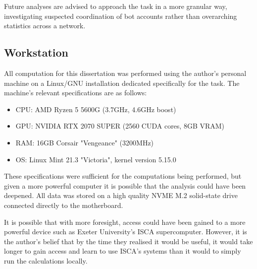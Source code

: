 \documentclass[a4paper,11pt]{article}  %
\begin{document}
	Future analyses are advised to approach the task in a more granular way, investigating suspected coordination of bot accounts rather than overarching statistics across a network.
	\newpage
	\begin{appendices}
	\section{Workstation}
	\label{app:work}
	All computation for this dissertation was performed using the author's personal machine on a Linux/GNU installation dedicated specifically for the task. The machine's relevant specifications are as follows:
	\begin{itemize}
		\item CPU: AMD Ryzen 5 5600G (3.7GHz, 4.6GHz boost)
		\item GPU: NVIDIA RTX 2070 SUPER (2560 CUDA cores, 8GB VRAM)
		\item RAM: 16GB Corsair "Vengeance" (3200MHz)
		\item OS: Linux Mint 21.3 "Victoria", kernel version 5.15.0
	\end{itemize}
	These specifications were sufficient for the computations being performed, but given a more powerful computer it is possible that the analysis could have been deepened. All data was stored on a high quality NVME M.2 solid-state drive connected directly to the motherboard.
	
	It is possible that with more foresight, access could have been gained to a more powerful device such as Exeter University's ISCA supercomputer. However, it is the author's belief that by the time they realised it would be useful, it would take longer to gain access and learn to use ISCA's systems than it would to simply run the calculations locally.

\end{appendices}
\end{document}
